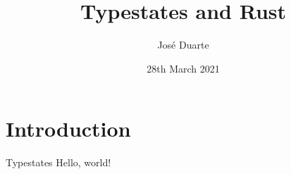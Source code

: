 \documentclass{beamer}
\title{Typestates and Rust}
\date{28th March 2021}
\author{José Duarte}
\institute{FCT NOVA}
\begin{document}
  \maketitle
  \section{Introduction}
  \begin{frame}{Typestates}
    Hello, world!
  \end{frame}
\end{document}
